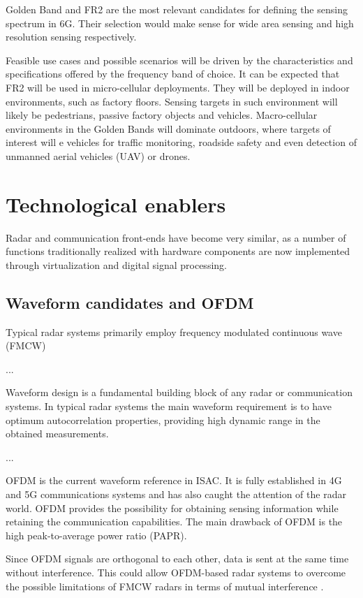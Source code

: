 Golden Band and FR2 are the most relevant candidates for defining the sensing spectrum in 6G. Their selection would make sense for wide area sensing and high resolution sensing respectively.

Feasible use cases and possible scenarios will be driven by the characteristics and specifications offered by the frequency band of choice. It can be expected that FR2 will be used in micro-cellular deployments. They will be deployed in indoor environments, such as factory floors. Sensing targets in such environment will likely be pedestrians, passive factory objects and vehicles.
Macro-cellular environments in the Golden Bands will dominate outdoors, where targets of interest will e vehicles for traffic monitoring, roadside safety and even detection of unmanned aerial vehicles (UAV) or drones.

\section{Technological enablers}
	
	Radar and communication front-ends have become very similar, as a number of functions traditionally realized with hardware components are now implemented through virtualization and digital signal processing.
	
	\subsection{Waveform candidates and OFDM}
	Typical radar systems primarily employ frequency modulated continuous wave (FMCW)
	
	...
	
	Waveform design is a fundamental building block of any radar or communication systems. In typical radar systems the main waveform requirement is to have optimum autocorrelation properties, providing high dynamic range in the obtained measurements.
	
	...
	
	OFDM is the current waveform reference in ISAC. It is fully established in 4G and 5G communications systems and has also caught the attention of the radar world. OFDM provides the possibility for obtaining sensing information while retaining the communication capabilities. The main drawback of OFDM is the high peak-to-average power ratio (PAPR).
	
	Since OFDM signals are orthogonal to each other, data is sent at the same time without interference. This could allow OFDM-based radar systems to overcome the possible limitations of FMCW radars in terms of mutual interference \cite{Goppelt_Blöcher_Menzel_2010}.
	
